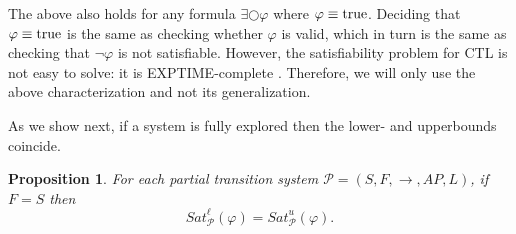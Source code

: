 \documentclass[12pt]{article}
\newcommand{\nxt}{\bigcirc}
\newcommand{\TRUE}{\mbox{\lstinline{true}}}
\newtheorem{proposition}{Proposition}
\theoremstyle{definition}
\begin{document}
The above also holds for any formula $\exists \nxt \varphi$ where $\varphi \equiv \TRUE$.  Deciding that $\varphi \equiv \TRUE$ is the same as checking whether $\varphi$ is valid, which in turn is the same as checking that $\neg \varphi$ is not satisfiable.  However, the satisfiability problem for CTL is not easy to solve: it is EXPTIME-complete \cite{FL79}.  Therefore, we will only use the above characterization and not its generalization.

As we show next, if a system is fully explored then the lower- and upperbounds coincide.

\begin{proposition}
For each partial transition system $\mathcal{P} = (S, F, \rightarrow, \mathit{AP}, L)$, if $F = S$ then
\[
\mathit{Sat}^{\ell}_{\mathcal{P}}(\varphi)
= \mathit{Sat}^u_{\mathcal{P}}(\varphi).
\]
\end{proposition}
\end{document}
